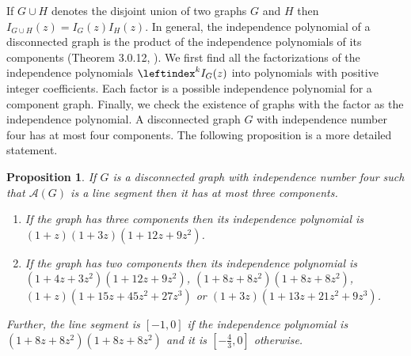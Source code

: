 \documentclass[12pt,a4paper]{article}
\theoremstyle{plain}
\newtheorem{proposition}[theorem]{Proposition}
\numberwithin{equation}{section}
\begin{document}
If $G \cup H$ denotes the disjoint union of two graphs $G$ and $H$ then $I_{G\cup H}(z)=I_G(z)I_H(z)$. In general, the independence polynomial of a disconnected graph is the product of the independence polynomials of its components (Theorem 3.0.12, \cite{hickman2001}). We first find all the factorizations of the independence polynomials \(\leftindex^k{I}_G(z)\)  into polynomials with positive integer coefficients. Each factor is a possible independence polynomial for a component graph. Finally, we check the existence of graphs with the factor as the independence polynomial.
A disconnected graph \(G\) with independence number four has at most four components. The following proposition is a more detailed statement.
\begin{proposition}
	If $G$ is a disconnected graph with independence number four such that $ \mathcal{A}(G)$ is a line segment then it has at most three components. 
	\begin{enumerate}
		\item If the graph has three components then its independence polynomial is $(1+z)(1+3z)(1+12z+9z^2)$.
		\item If the graph has two components then its independence polynomial is $(1+4z+3z^2)(1+12z+9z^2)$, $(1+8z+8z^2)(1+8z+8z^2)$,  $(1+z)(1+15z+45z^2+27z^3)$ or $(1+3z)(1+13z+21z^2+9z^3)$.
	\end{enumerate}
	Further, the line segment is $[-1,0]$ if the independence  polynomial is  $(1+8z+8z^2)(1+8z+8z^2)$ and it is $[-\frac{4}{3},0]$ otherwise.
\label{disconnectedgraphs}
\end{proposition}
\end{document}
